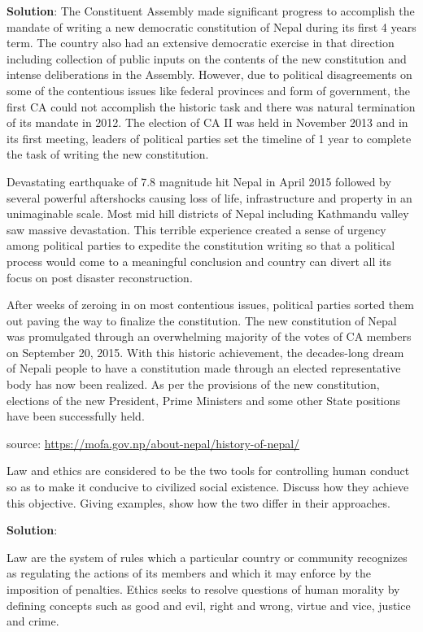 \documentclass[
  openany]{book}
\newcommand{\question}{\item}
\newenvironment{solution}{ {\bfseries Solution}:}{}
\begin{document}
\begin{questions}
\begin{solution}
The Constituent Assembly made significant progress to accomplish the mandate of writing a new democratic constitution of Nepal during its first 4 years term. The country also had an extensive democratic exercise in that direction including collection of public inputs on the contents of the new constitution and intense deliberations in the Assembly. However, due to political disagreements on some of the contentious issues like federal provinces and form of government, the first CA could not accomplish the historic task and there was natural termination of its mandate in 2012. The election of CA II was held in November 2013 and in its first meeting, leaders of political parties set the timeline of 1 year to complete the task of writing the new constitution.

Devastating earthquake of 7.8 magnitude hit Nepal in April 2015 followed by several powerful aftershocks causing loss of life, infrastructure and property in an unimaginable scale. Most mid hill districts of Nepal including Kathmandu valley saw massive devastation. This terrible experience created a sense of urgency among political parties to expedite the constitution writing so that a political process would come to a meaningful conclusion and country can divert all its focus on post disaster reconstruction.

After weeks of zeroing in on most contentious issues, political parties sorted them out paving the way to finalize the constitution. The new constitution of Nepal was promulgated through an overwhelming majority of the votes of CA members on September 20, 2015. With this historic achievement, the decades-long dream of Nepali people to have a constitution made through an elected representative body has now been realized. As per the provisions of the new constitution, elections of the new President, Prime Ministers and some other State positions have been successfully held.

source: \url{https://mofa.gov.np/about-nepal/history-of-nepal/}
\end{solution}

\question Law and ethics are considered to be the two tools for controlling human conduct so as to make it conducive to civilized social existence. Discuss how they achieve this objective. Giving examples, show how the two differ in their approaches.

\begin{solution}

Law are the system of rules which a particular country or community recognizes as regulating the actions of its members and which it may enforce by the imposition of penalties.
Ethics seeks to resolve questions of human morality by defining concepts such as good and evil, right and wrong, virtue and vice, justice and crime.


\end{solution}
\end{questions}
\end{document}
